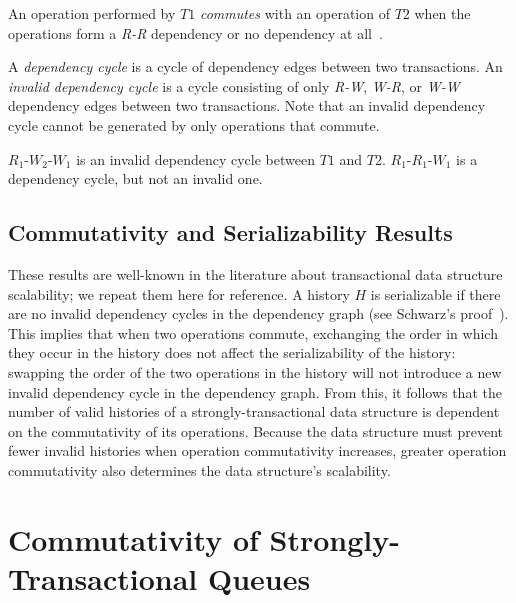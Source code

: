 \begin{defn}
    An operation performed by $T1$ \emph{commutes} with an operation of $T2$ when the operations form a \emph{R-R} dependency or no dependency at all~\cite{weihl}.
\end{defn}

\begin{defn}
    A \emph{dependency cycle} is a cycle of dependency edges between two transactions. An \emph{invalid dependency cycle} is a cycle consisting of only \emph{R-W}, \emph{W-R}, or \emph{W-W} dependency edges between two transactions. Note that an invalid dependency cycle cannot be generated by only operations that commute.
\end{defn}
\begin{eg}
    $R_1$-$W_2$-$W_1$ is an invalid dependency cycle between $T1$ and $T2$.
    $R_1$-$R_1$-$W_1$ is a dependency cycle, but not an invalid one.
\end{eg}

\subsection{Commutativity and Serializability Results}

These results are well-known in the literature about transactional data structure scalability; we repeat them here for reference.
A history $H$ is serializable if there are no invalid dependency cycles in the dependency graph (see Schwarz's proof~\cite{schwarz}). This implies that when two operations commute, exchanging the order in which they occur in the history does not affect the serializability of the history: swapping the order of the two operations in the history will not introduce a new invalid dependency cycle in the dependency graph. From this, it follows that the number of valid histories of a strongly-transactional data structure is dependent on the commutativity of its operations.
Because the data structure must prevent fewer invalid histories when operation commutativity increases, greater operation commutativity also determines the data structure's scalability. 

\section{Commutativity of Strongly-Transactional Queues}

